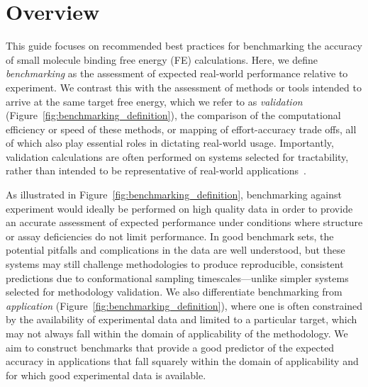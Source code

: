 \documentclass[9pt,bestpractices,pubversion]{livecoms}
\begin{document}

\section{Overview}

This guide focuses on recommended best practices for benchmarking the accuracy of small molecule binding free energy (FE) calculations. 
Here, we define \emph{benchmarking} as the assessment of expected real-world performance relative to experiment.
We contrast this with the assessment of methods or tools intended to arrive at the same target free energy, which we refer to as \emph{validation} (Figure~\ref{fig:benchmarking_definition}), the comparison of the computational efficiency or speed of these methods, or mapping of effort-accuracy trade offs, all of which also play essential roles in dictating real-world usage.
Importantly, validation calculations are often performed on systems selected for tractability, rather than intended to be representative of real-world applications~\cite{mobleyPredictingBindingFree2017,vangunsteren_validation_2018,tsai_validation_2020}. 


%

As illustrated in Figure~\ref{fig:benchmarking_definition}, benchmarking against experiment would ideally be performed on high quality data in order to provide an accurate assessment of expected performance under conditions where structure or assay deficiencies do not limit performance. 
In good benchmark sets, the potential pitfalls and complications in the data are well understood, but these systems may still challenge methodologies to produce reproducible, consistent predictions due to conformational sampling timescales---unlike simpler systems selected for methodology validation.
We also differentiate benchmarking from \emph{application} (Figure~\ref{fig:benchmarking_definition}), where one is often constrained by the availability of experimental data and limited to a particular target, which may not always fall within the domain of applicability of the methodology. 
We aim to construct benchmarks that provide a good predictor of the expected accuracy in applications that fall squarely within the domain of applicability and for which good experimental data is available.
\end{document}
